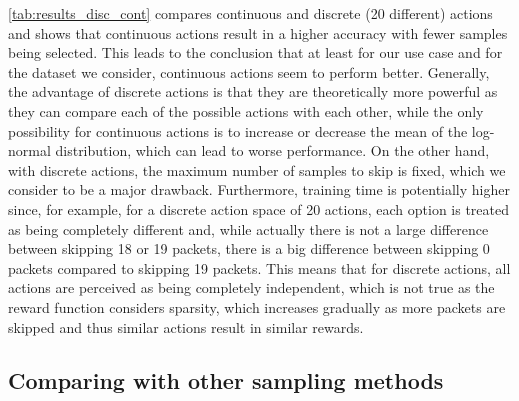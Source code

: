 \documentclass[conference]{IEEEtran}
\newcommand\setrow[1]{\gdef\rowmac{#1}#1\ignorespaces}
\newcommand\clearrow{\global\let\rowmac\relax}
\begin{document}
\autoref{tab:results_disc_cont} compares continuous and discrete (20 different) actions and shows that continuous actions result in a higher accuracy with fewer samples being selected. This leads to the conclusion that at least for our use case and for the dataset we consider, continuous actions seem to perform better. Generally, the advantage of discrete actions is that they are theoretically more powerful as they can compare each of the possible actions with each other, while the only possibility for continuous actions is to increase or decrease the mean of the log-normal distribution, which can lead to worse performance. On the other hand, with discrete actions, the maximum number of samples to skip is fixed, which we consider to be a major drawback. Furthermore, training time is potentially higher since, for example, for a discrete action space of 20 actions, each option is treated as being completely different and, while actually there is not a large difference between skipping 18 or 19 packets, there is a big difference between skipping 0 packets compared to skipping 19 packets. This means that for discrete actions, all actions are perceived as being completely independent, which is not true as the reward function considers sparsity, which increases gradually as more packets are skipped and thus similar actions result in similar rewards.

\subsection{Comparing with other sampling methods}

\end{document}
